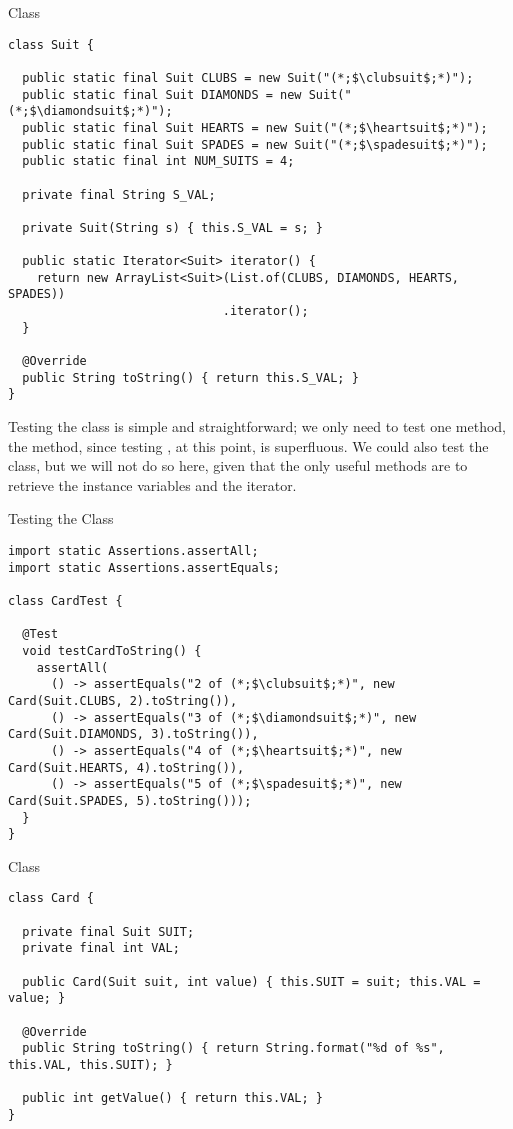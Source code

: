 \begin{cl}[]{ Class}
\begin{lstlisting}[language=MyJava]
class Suit {

  public static final Suit CLUBS = new Suit("(*;$\clubsuit$;*)");
  public static final Suit DIAMONDS = new Suit("(*;$\diamondsuit$;*)");
  public static final Suit HEARTS = new Suit("(*;$\heartsuit$;*)");
  public static final Suit SPADES = new Suit("(*;$\spadesuit$;*)");
  public static final int NUM_SUITS = 4;

  private final String S_VAL;

  private Suit(String s) { this.S_VAL = s; }

  public static Iterator<Suit> iterator() {
    return new ArrayList<Suit>(List.of(CLUBS, DIAMONDS, HEARTS, SPADES))
                              .iterator();
  }

  @Override
  public String toString() { return this.S_VAL; }
}
\end{lstlisting}
\end{cl}

Testing the  class is simple and straightforward; we only need to test one method, the  method, since testing , at this point, is superfluous. We could also test the  class, but we will not do so here, given that the only useful methods are to retrieve the instance variables and the iterator.

\begin{cl}[]{Testing the  Class}
\begin{lstlisting}[language=MyJava]
import static Assertions.assertAll;
import static Assertions.assertEquals;

class CardTest {

  @Test
  void testCardToString() {
    assertAll(
      () -> assertEquals("2 of (*;$\clubsuit$;*)", new Card(Suit.CLUBS, 2).toString()),
      () -> assertEquals("3 of (*;$\diamondsuit$;*)", new Card(Suit.DIAMONDS, 3).toString()),
      () -> assertEquals("4 of (*;$\heartsuit$;*)", new Card(Suit.HEARTS, 4).toString()),
      () -> assertEquals("5 of (*;$\spadesuit$;*)", new Card(Suit.SPADES, 5).toString()));
  }
}
\end{lstlisting}
\end{cl}

\begin{cl}[]{ Class}
\begin{lstlisting}[language=MyJava]
class Card {

  private final Suit SUIT;
  private final int VAL;

  public Card(Suit suit, int value) { this.SUIT = suit; this.VAL = value; }
  
  @Override
  public String toString() { return String.format("%d of %s", this.VAL, this.SUIT); }

  public int getValue() { return this.VAL; } 
}
\end{lstlisting}
\end{cl}


